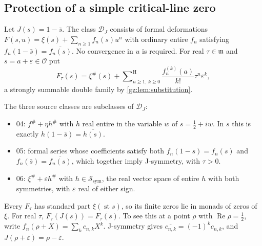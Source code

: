 \documentclass[11pt,a4paper]{article}
\numberwithin{equation}{section}
\theoremstyle{definition}
\theoremstyle{remark}
\newcommand{\OO}{\mathcal O}
\newcommand{\mm}{\mathfrak m}
\newcommand{\eps}{\varepsilon}
\renewcommand{\Re}{\operatorname{Re}}
\newcommand{\st}{\operatorname{st}}
\newcommand{\Sh}{\mathop{\textstyle\sum}\nolimits^{\mathrm H}}
\newcommand{\xip}{\xi^{\#}}
\newcommand{\DJs}{\mathcal D_{J}}
\newcommand{\Ssym}{\mathcal S_{\mathrm{sym}}}
\begin{document}
\subsection{Protection of a simple critical-line zero}
\begin{definition}\label{gz:def:DJ}
Let $J(s)=1-\bar s$. The class $\DJs$ consists of formal deformations
$F(s,u)=\xi(s)+\sum_{n\ge1}f_n(s)u^n$ with ordinary entire $f_n$ satisfying
$f_n(1-\bar s)=\overline{f_n(s)}$. No convergence in $u$ is required. For
real $\tau\in\mm$ and $s=a+\eps\in\OO$ put
\[
F_\tau(s)=\xip(s)+\Sh_{n\ge1,\,k\ge0}\frac{f_n^{(k)}(a)}{k!}\tau^n\eps^k ,
\]
a strongly summable double family by \cref{gz:lem:substitution}.
\end{definition}
The three source classes are subclasses of $\DJs$:
\begin{itemize}
\item 04: $f^\#+\eta h^\#$ with $h$ real entire in the variable $w$ of
 $s=\tfrac12+iw$. In $s$ this is exactly $h(1-\bar s)=\overline{h(s)}$.
\item 05: formal series whose coefficients satisfy both $f_n(1-s)=f_n(s)$
 and $f_n(\bar s)=\overline{f_n(s)}$, which together imply J-symmetry,
 with $\tau>0$.
\item 06: $\xip+\eps h^\#$ with $h\in\Ssym$, the real vector space of entire
 $h$ with both symmetries, with $\eps$ real of either sign.
\end{itemize}
Every $F_\tau$ has standard part $\xi(\st s)$, so its finite zeros lie in
monads of zeros of $\xi$. For real $\tau$,
$F_\tau(J(s))=\overline{F_\tau(s)}$. To see this at a point $\rho$ with
$\Re\rho=\tfrac12$, write $f_n(\rho+X)=\sum_kc_{n,k}X^k$. J-symmetry gives
$\overline{c_{n,k}}=(-1)^kc_{n,k}$, and $J(\rho+\eps)=\rho-\bar\eps$.
\end{document}
